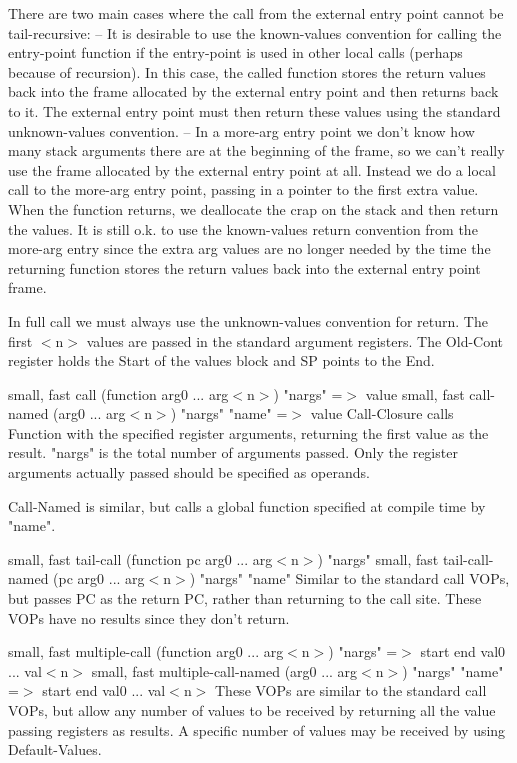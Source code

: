 {\begin{itemize, spread 0, spacing 1}
There are two main cases where the call from the external entry point cannot be
tail-recursive:
 -- It is desirable to use the known-values convention for calling the
    entry-point function if the entry-point is used in other local calls
    (perhaps because of recursion).  In this case, the called function stores
    the return values back into the frame allocated by the external entry point
    and then returns back to it.  The external entry point must then return
    these values using the standard unknown-values convention.
 -- In a more-arg entry point we don't know how many stack arguments there are
    at the beginning of the frame, so we can't really use the frame allocated
    by the external entry point at all.  Instead we do a local call to the
    more-arg entry point, passing in a pointer to the first extra value.  When
    the function returns, we deallocate the crap on the stack and then return
    the values.  It is still o.k. to use the known-values return convention
    from the more-arg entry since the extra arg values are no longer needed by
    the time the returning function stores the return values back into the
    external entry point frame.


In full call we must always use the unknown-values convention for return.  The
first $<$n$>$ values are passed in the standard argument registers.  The Old-Cont
register holds the Start of the values block and SP points to the End.


{small, fast} call (function arg0 ... arg$<$n$>$) "nargs" =$>$ value
{small, fast} call-named (arg0 ... arg$<$n$>$) "nargs" "name" =$>$ value
    Call-Closure calls Function with the specified register arguments,
    returning the first value as the result.  "nargs" is the total number of
    arguments passed.  Only the register arguments actually passed should be
    specified as operands.

    Call-Named is similar, but calls a global function specified at compile
    time by "name".

{small, fast} tail-call (function pc arg0 ... arg$<$n$>$) "nargs"
{small, fast} tail-call-named (pc arg0 ... arg$<$n$>$) "nargs" "name"
    Similar to the standard call VOPs, but passes PC as the return PC, rather
    than returning to the call site.  These VOPs have no results since they
    don't return.

{small, fast} multiple-call (function arg0 ... arg$<$n$>$) "nargs"
                                    =$>$ start end val0 ... val$<$n$>$
{small, fast} multiple-call-named (arg0 ... arg$<$n$>$) "nargs" "name"
                                  =$>$ start end val0 ... val$<$n$>$
    These VOPs are similar to the standard call VOPs, but allow any number of 
    values to be received by returning all the value passing registers as
    results.  A specific number of values may be received by using
    Default-Values. 


\end{itemize, spread 0, spacing 1}}
